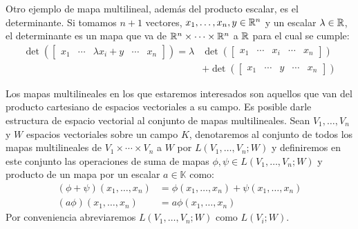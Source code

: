Otro ejemplo de mapa multilineal, además del producto escalar, es el determinante. Si tomamos $n+1$ vectores, $x_1, \ldots, x_n, y \in \mathbb{R}^n$ y un escalar $\lambda \in \mathbb{R}$, el determinante es un mapa que va de $\mathbb{R}^n \times \cdots \times \mathbb{R}^n$ a $\mathbb{R}$ para el cual se cumple:
\begin{align*}
	\det(\begin{bmatrix}x_1 & \cdots & \lambda x_i + y & \cdots & x_n \end{bmatrix}) = \lambda &
	\det(\begin{bmatrix}x_1 & \cdots &x_i&\cdots& x_n \end{bmatrix})                                                                                                  \\
	                                                                                           & + \det(\begin{bmatrix}x_1 & \cdots & y & \cdots & x_n \end{bmatrix})
\end{align*}

Los mapas multilineales en los que estaremos interesados son aquellos que van del producto cartesiano de espacios vectoriales a su campo. Es posible darle estructura de espacio vectorial al conjunto de mapas multilineales. Sean $V_1, \ldots, V_n$ y $W$ espacios vectoriales sobre un campo $K$, denotaremos al conjunto de todos los mapas multilineales de $V_1 \times \cdots \times V_n$ a $W$ por $L(V_1,\ldots,V_n;W)$ y definiremos en este conjunto las operaciones de suma de mapas $\phi, \psi \in L(V_1,\ldots,V_n;W)$ y producto de un mapa por un escalar $a \in \mathbb{K}$ como:
\begin{align*}
	(\phi + \psi)(x_1, \ldots, x_n) & = \phi(x_1,\ldots,x_n) + \psi(x_1,\ldots,x_n) \\
	(a \phi)(x_1, \ldots, x_n)      & = a \phi(x_1, \ldots, x_n)
\end{align*}
Por conveniencia abreviaremos $L(V_1, \ldots, V_n; W)$ como $L(V_i;W)$.
